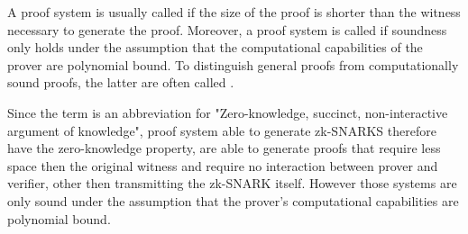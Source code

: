 A proof system is usually called  if the size of the proof is shorter than the witness necessary to generate the proof. Moreover, a proof system is called  if soundness only holds under the assumption that the computational capabilities of the prover are polynomial bound. To distinguish general proofs from computationally sound proofs, the latter are often called .

Since the term  is an abbreviation for "Zero-knowledge, succinct, non-interactive argument of knowledge", proof system able to generate zk-SNARKS therefore have the zero-knowledge property, are able to generate proofs that require less space then the original witness and require no interaction between prover and verifier, other then transmitting the zk-SNARK itself. However those systems are only sound under the assumption that the prover's computational capabilities are polynomial bound.
